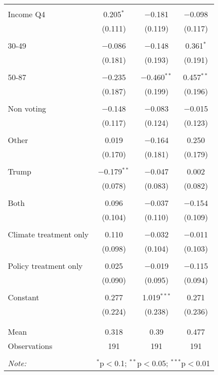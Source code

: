 \begin{tabular}{@{\extracolsep{5pt}}lccc}
  & & & \\ 
 Income Q4 & 0.205$^{*}$ & $-$0.181 & $-$0.098 \\ 
  & (0.111) & (0.119) & (0.117) \\ 
  & & & \\ 
 30-49 & $-$0.086 & $-$0.148 & 0.361$^{*}$ \\ 
  & (0.181) & (0.193) & (0.191) \\ 
  & & & \\ 
 50-87 & $-$0.235 & $-$0.460$^{**}$ & 0.457$^{**}$ \\ 
  & (0.187) & (0.199) & (0.196) \\ 
  & & & \\ 
 Non voting & $-$0.148 & $-$0.083 & $-$0.015 \\ 
  & (0.117) & (0.124) & (0.123) \\ 
  & & & \\ 
 Other & 0.019 & $-$0.164 & 0.250 \\ 
  & (0.170) & (0.181) & (0.179) \\ 
  & & & \\ 
 Trump & $-$0.179$^{**}$ & $-$0.047 & 0.002 \\ 
  & (0.078) & (0.083) & (0.082) \\ 
  & & & \\ 
 Both & 0.096 & $-$0.037 & $-$0.154 \\ 
  & (0.104) & (0.110) & (0.109) \\ 
  & & & \\ 
 Climate treatment only & 0.110 & $-$0.032 & $-$0.011 \\ 
  & (0.098) & (0.104) & (0.103) \\ 
  & & & \\ 
 Policy treatment only & 0.025 & $-$0.019 & $-$0.115 \\ 
  & (0.090) & (0.095) & (0.094) \\ 
  & & & \\ 
 Constant & 0.277 & 1.019$^{***}$ & 0.271 \\ 
  & (0.224) & (0.238) & (0.236) \\ 
  & & & \\ 
\hline \\[-1.8ex] 
Mean & 0.318 & 0.39 & 0.477 \\ 
Observations & 191 & 191 & 191 \\ 
\hline 
\hline \\[-1.8ex] 
\textit{Note:}  & \multicolumn{3}{r}{$^{*}$p$<$0.1; $^{**}$p$<$0.05; $^{***}$p$<$0.01} \\ 
\end{tabular} 
